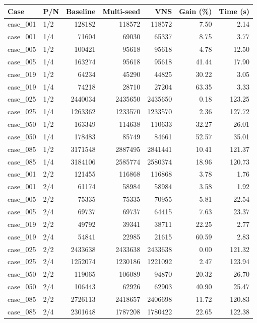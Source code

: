 \begin{tabular}{llrrrrr}
\toprule
Case & P/N & Baseline & Multi-seed & VNS & Gain (\%) & Time (s) \\
\midrule
case\_001 & 1/2 & 128182 & 118572 & 118572 & 7.50 & 2.14 \\
case\_001 & 1/4 & 71604 & 69030 & 65337 & 8.75 & 3.77 \\
case\_005 & 1/2 & 100421 & 95618 & 95618 & 4.78 & 12.50 \\
case\_005 & 1/4 & 163274 & 95618 & 95618 & 41.44 & 17.90 \\
case\_019 & 1/2 & 64234 & 45290 & 44825 & 30.22 & 3.05 \\
case\_019 & 1/4 & 74218 & 28710 & 27204 & 63.35 & 3.33 \\
case\_025 & 1/2 & 2440034 & 2435650 & 2435650 & 0.18 & 123.25 \\
case\_025 & 1/4 & 1263362 & 1233570 & 1233570 & 2.36 & 127.72 \\
case\_050 & 1/2 & 163349 & 114638 & 110633 & 32.27 & 26.01 \\
case\_050 & 1/4 & 178483 & 85749 & 84661 & 52.57 & 35.01 \\
case\_085 & 1/2 & 3171548 & 2887495 & 2841441 & 10.41 & 121.37 \\
case\_085 & 1/4 & 3184106 & 2585774 & 2580374 & 18.96 & 120.73 \\
case\_001 & 2/2 & 121455 & 116868 & 116868 & 3.78 & 1.76 \\
case\_001 & 2/4 & 61174 & 58984 & 58984 & 3.58 & 1.92 \\
case\_005 & 2/2 & 75335 & 75335 & 70955 & 5.81 & 22.54 \\
case\_005 & 2/4 & 69737 & 69737 & 64415 & 7.63 & 23.37 \\
case\_019 & 2/2 & 49792 & 39341 & 38711 & 22.25 & 2.77 \\
case\_019 & 2/4 & 54841 & 22985 & 21615 & 60.59 & 2.83 \\
case\_025 & 2/2 & 2433638 & 2433638 & 2433638 & 0.00 & 121.32 \\
case\_025 & 2/4 & 1252074 & 1230186 & 1221092 & 2.47 & 123.94 \\
case\_050 & 2/2 & 119065 & 106089 & 94870 & 20.32 & 26.70 \\
case\_050 & 2/4 & 106443 & 62926 & 62903 & 40.90 & 25.47 \\
case\_085 & 2/2 & 2726113 & 2418657 & 2406698 & 11.72 & 120.83 \\
case\_085 & 2/4 & 2301648 & 1787208 & 1780422 & 22.65 & 122.38 \\

\end{tabular}
